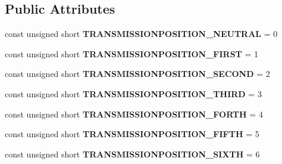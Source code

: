\subsection*{Public Attributes}
\begin{DoxyCompactItemize}
\item 
\hypertarget{interfaceVehicle_1_1Transmission_a505c9501e453313dcf53c21fbdb9a3e8}{const unsigned short {\bfseries T\-R\-A\-N\-S\-M\-I\-S\-S\-I\-O\-N\-P\-O\-S\-I\-T\-I\-O\-N\-\_\-\-N\-E\-U\-T\-R\-A\-L} = 0}\label{interfaceVehicle_1_1Transmission_a505c9501e453313dcf53c21fbdb9a3e8}

\item 
\hypertarget{interfaceVehicle_1_1Transmission_a1bcf4f1462c4bbf1e1a77cd267f2634b}{const unsigned short {\bfseries T\-R\-A\-N\-S\-M\-I\-S\-S\-I\-O\-N\-P\-O\-S\-I\-T\-I\-O\-N\-\_\-\-F\-I\-R\-S\-T} = 1}\label{interfaceVehicle_1_1Transmission_a1bcf4f1462c4bbf1e1a77cd267f2634b}

\item 
\hypertarget{interfaceVehicle_1_1Transmission_a46bcb495db2a4cad184d945a485ff2d5}{const unsigned short {\bfseries T\-R\-A\-N\-S\-M\-I\-S\-S\-I\-O\-N\-P\-O\-S\-I\-T\-I\-O\-N\-\_\-\-S\-E\-C\-O\-N\-D} = 2}\label{interfaceVehicle_1_1Transmission_a46bcb495db2a4cad184d945a485ff2d5}

\item 
\hypertarget{interfaceVehicle_1_1Transmission_a325ab0323cef285b41bdccda7be5ca0c}{const unsigned short {\bfseries T\-R\-A\-N\-S\-M\-I\-S\-S\-I\-O\-N\-P\-O\-S\-I\-T\-I\-O\-N\-\_\-\-T\-H\-I\-R\-D} = 3}\label{interfaceVehicle_1_1Transmission_a325ab0323cef285b41bdccda7be5ca0c}

\item 
\hypertarget{interfaceVehicle_1_1Transmission_a481671cafa76bdfa2f6f30ce995cbba8}{const unsigned short {\bfseries T\-R\-A\-N\-S\-M\-I\-S\-S\-I\-O\-N\-P\-O\-S\-I\-T\-I\-O\-N\-\_\-\-F\-O\-R\-T\-H} = 4}\label{interfaceVehicle_1_1Transmission_a481671cafa76bdfa2f6f30ce995cbba8}

\item 
\hypertarget{interfaceVehicle_1_1Transmission_a352f7fa0dcfc1184a8bc9927f40bfaac}{const unsigned short {\bfseries T\-R\-A\-N\-S\-M\-I\-S\-S\-I\-O\-N\-P\-O\-S\-I\-T\-I\-O\-N\-\_\-\-F\-I\-F\-T\-H} = 5}\label{interfaceVehicle_1_1Transmission_a352f7fa0dcfc1184a8bc9927f40bfaac}

\item 
\hypertarget{interfaceVehicle_1_1Transmission_a592a068a7c25610652e812201ab23684}{const unsigned short {\bfseries T\-R\-A\-N\-S\-M\-I\-S\-S\-I\-O\-N\-P\-O\-S\-I\-T\-I\-O\-N\-\_\-\-S\-I\-X\-T\-H} = 6}\label{interfaceVehicle_1_1Transmission_a592a068a7c25610652e812201ab23684}


\end{DoxyCompactItemize}
